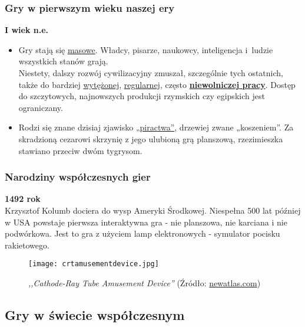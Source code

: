 \documentclass{beamer}
\begin{document}

\begin{frame}
\frametitle{Gry w pierwszym wieku naszej ery}
    \textbf{I wiek n.e.}\\
    \begin{itemize}
        \item Gry stają się \underline{masowe}. Władcy, pisarze, naukowcy, inteligencja i~ludzie wszystkich stanów grają.\\Niestety, dalszy rozwój cywilizacyjny zmuszał, szczególnie tych ostatnich, także do bardziej \underline{wytężonej}, \underline{regularnej}, często \underline{\textbf{niewolniczej pracy}}. Dostęp do szczytowych, najnowszych produkcji rzymskich czy egipskich jest ograniczany.
        
        \item Rodzi się znane dzisiaj zjawisko \underline{„piractwa”}, drzewiej zwane „koszeniem”. Za skradzioną cezarowi skrzynię z jego ulubioną grą planszową, rzezimieszka stawiano przeciw dwóm tygrysom.
    \end{itemize}
\end{frame}

\begin{frame}
\frametitle{Narodziny współczesnych gier}
    \textbf{1492 rok}\\
    Krzysztof Kolumb dociera do wysp Ameryki Środkowej. Niespełna 500 lat później w USA powstaje pierwsza interaktywna gra - nie planszowa, nie karciana i nie podwórkowa. Jest to gra z użyciem lamp elektronowych - symulator pocisku rakietowego.
    \begin{figure}[h]
        \centering
        \texttt{[image: crtamusementdevice.jpg]}
        \caption{\textit{,,Cathode-Ray Tube Amusement Device''} (Źródło: \url{newatlas.com})}
    \end{figure}
\end{frame}


\subsection{Gry w świecie współczesnym}
\end{document}
